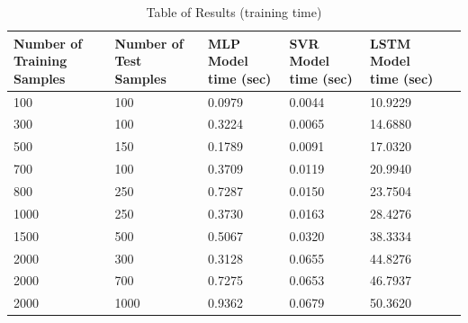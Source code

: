 \documentclass{article}
\begin{document}
\begin{table}[ht]
	\centering
	\begin{tabular}{p{2cm} p{2cm} p{2cm} p{2cm} p{2cm} p{2cm}}
		\toprule
		Number of Training Samples & Number of Test Samples & MLP Model time (sec) & SVR Model time (sec) & LSTM Model time (sec) \\
		\midrule
		100 & 100 & 0.0979 & 0.0044 & 10.9229 \\
		\midrule
		300 & 100 & 0.3224 & 0.0065 & 14.6880 \\
		\midrule
		500 & 150 & 0.1789 & 0.0091 & 17.0320 \\
		\midrule
		700 & 100 & 0.3709 & 0.0119 & 20.9940 \\
		\midrule
		800 & 250 & 0.7287 & 0.0150 & 23.7504 \\
		\midrule
		1000 & 250 & 0.3730 & 0.0163 & 28.4276 \\
		\midrule
		1500 & 500 & 0.5067 & 0.0320 & 38.3334 \\
		\midrule
		2000 & 300 & 0.3128 & 0.0655 & 44.8276 \\
		\midrule
		2000 & 700 & 0.7275 & 0.0653 & 46.7937 \\
		\midrule
		2000 & 1000 & 0.9362 & 0.0679 & 50.3620 \\
		\bottomrule
	\end{tabular}
	\caption{Table of Results (training time)}
\end{table}
\end{document}
